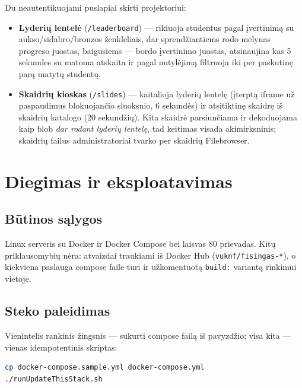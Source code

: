 \documentclass[11pt,a4paper]{article}
\newcommand{\code}[1]{\texttt{#1}}
\begin{document}
Du neautentikuojami puslapiai skirti projektoriui:

\begin{itemize}
  \item \textbf{Lyderių lentelė} (\code{/leaderboard}) — rikiuoja
        studentus pagal įvertinimą su aukso/sidabro/bronzos
        ženkleliais, dar sprendžiantiems rodo mėlynas progreso
        juostas, baigusiems — bordo įvertinimo juostas, atsinaujina
        kas 5 sekundes su matoma atskaita ir pagal nutylėjimą
        filtruoja iki per paskutinę parą matytų studentų.
  \item \textbf{Skaidrių kioskas} (\code{/slides}) — kaitalioja
        lyderių lentelę (įterptą iframe už paspaudimus blokuojančio
        sluoksnio, 6 sekundės) ir atsitiktinę skaidrę iš skaidrių
        katalogo (20 sekundžių). Kita skaidrė parsiunčiama ir
        dekoduojama kaip blob \emph{dar rodant lyderių lentelę}, tad
        keitimas visada akimirksninis; skaidrių failus
        administratoriai tvarko per skaidrių Filebrowser.
\end{itemize}

\section{Diegimas ir eksploatavimas}
\label{sec:usage}

\subsection{Būtinos sąlygos}

Linux serveris su Docker ir Docker Compose bei laisvas 80 prievadas.
Kitų priklausomybių nėra: atvaizdai traukiami iš Docker Hub
(\code{vuknf/fisingas-*}), o kiekviena paslauga compose faile turi ir
užkomentuotą \code{build:} variantą rinkimui vietoje.

\subsection{Steko paleidimas}
\label{sec:deploy}

Vienintelis rankinis žingsnis — sukurti compose failą iš pavyzdžio;
visa kita — vienas idempotentinis skriptas:

\begin{lstlisting}[language=bash]
cp docker-compose.sample.yml docker-compose.yml
./runUpdateThisStack.sh
\end{lstlisting}
\end{document}
